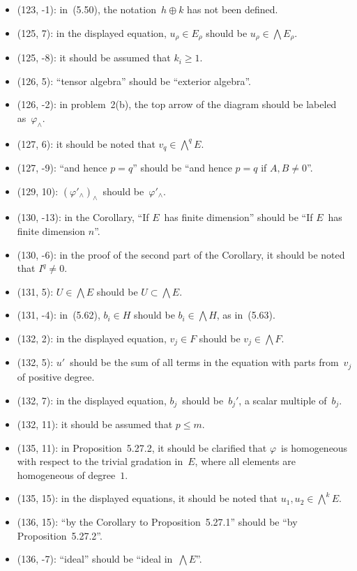 \documentclass[letterpaper,12pt]{article}
\newcommand{\dsum}{\oplus}
\newcommand{\eprod}{\wedge}
\newcommand{\bigeprod}{\bigwedge}
\begin{document}
\begin{itemize}
\item (123, -1): in~(5.50), the notation~\(h\dsum k\) has not been defined.
\item (125, 7): in the displayed equation, \(u_{\rho}\in E_{\rho}\) should be \(u_{\rho}\in\bigeprod E_{\rho}\).
\item (125, -8): it should be assumed that \(k_i\ge 1\).
\item (126, 5): ``tensor algebra'' should be ``exterior algebra''.
\item (126, -2): in problem~2(b), the top arrow of the diagram should be labeled as~\(\varphi_{\eprod}\).
\item (127, 6): it should be noted that \(v_q\in\bigeprod^q E\).
\item (127, -9): ``and hence \(p=q\)'' should be ``and hence \(p=q\) if \(A,B\ne 0\)''.
\item (129, 10): \((\varphi'_{\eprod})_{\eprod}\)~should be~\(\varphi'_{\eprod}\).
\item (130, -13): in the Corollary, ``If \(E\)~has finite dimension'' should be ``If \(E\)~has finite dimension \(n\)''.
\item (130, -6): in the proof of the second part of the Corollary, it should be noted that \(I^q\ne 0\).
\item (131, 5): \(U\in\bigeprod E\) should be \(U\subset\bigeprod E\).
\item (131, -4): in~(5.62), \(b_i\in H\) should be \(b_i\in\bigeprod H\), as in~(5.63).
\item (132, 2): in the displayed equation, \(v_j\in F\) should be \(v_j\in\bigeprod F\).
\item (132, 5): \(u'\)~should be the sum of all terms in the equation with parts from~\(v_j\) of positive degree.
\item (132, 7): in the displayed equation, \(b_j\)~should be~\(b_j'\), a scalar multiple of~\(b_j\).
\item (132, 11): it should be assumed that \(p\le m\).
\item (135, 11): in Proposition~5.27.2, it should be clarified that \(\varphi\)~is homogeneous with respect to the trivial gradation in~\(E\), where all elements are homogeneous of degree~\(1\).
\item (135, 15): in the displayed equations, it should be noted that \(u_1,u_2\in\bigeprod^k E\).
\item (136, 15): ``by the Corollary to Proposition~5.27.1'' should be ``by Proposition~5.27.2''.
\item (136, -7): ``ideal'' should be ``ideal in~\(\bigeprod E\)''.

\end{itemize}
\end{document}
